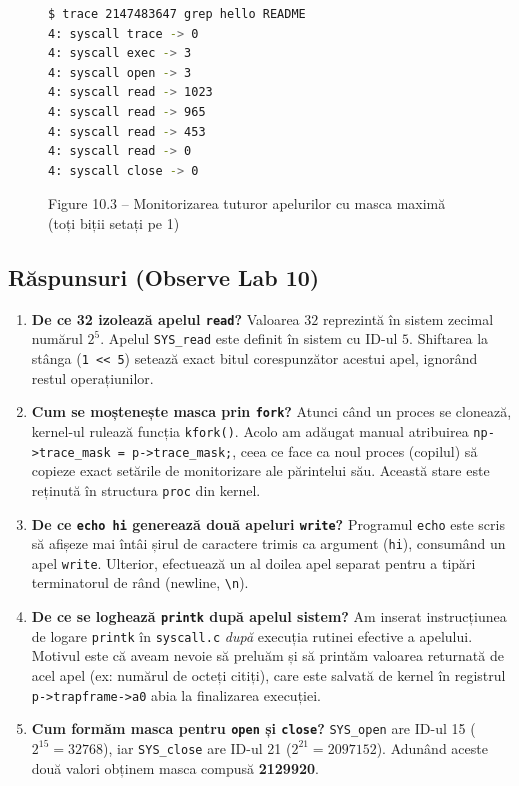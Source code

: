 \documentclass[12pt,a4paper]{article}
\begin{document}
\begin{figure}[h!]
\begin{lstlisting}[language=bash]
$ trace 2147483647 grep hello README
4: syscall trace -> 0
4: syscall exec -> 3
4: syscall open -> 3
4: syscall read -> 1023
4: syscall read -> 965
4: syscall read -> 453
4: syscall read -> 0
4: syscall close -> 0
\end{lstlisting}
\caption{Figure 10.3 -- Monitorizarea tuturor apelurilor cu masca maximă (toți biții setați pe 1)}
\end{figure}

\subsection{Răspunsuri (Observe Lab 10)}
\begin{enumerate}
    \item \textbf{De ce 32 izolează apelul \texttt{read}?} Valoarea $32$ reprezintă în sistem zecimal numărul $2^5$. Apelul \texttt{SYS\_read} este definit în sistem cu ID-ul $5$. Shiftarea la stânga (\texttt{1 << 5}) setează exact bitul corespunzător acestui apel, ignorând restul operațiunilor.
    \item \textbf{Cum se moștenește masca prin \texttt{fork}?} Atunci când un proces se clonează, kernel-ul rulează funcția \texttt{kfork()}. Acolo am adăugat manual atribuirea \texttt{np->trace\_mask = p->trace\_mask;}, ceea ce face ca noul proces (copilul) să copieze exact setările de monitorizare ale părintelui său. Această stare este reținută în structura \texttt{proc} din kernel.
    \item \textbf{De ce \texttt{echo hi} generează două apeluri \texttt{write}?} Programul \texttt{echo} este scris să afișeze mai întâi șirul de caractere trimis ca argument (\texttt{hi}), consumând un apel \texttt{write}. Ulterior, efectuează un al doilea apel separat pentru a tipări terminatorul de rând (newline, \texttt{\textbackslash n}).
    \item \textbf{De ce se loghează \texttt{printk} după apelul sistem?} Am inserat instrucțiunea de logare \texttt{printk} în \texttt{syscall.c} \textit{după} execuția rutinei efective a apelului. Motivul este că aveam nevoie să preluăm și să printăm valoarea returnată de acel apel (ex: numărul de octeți citiți), care este salvată de kernel în registrul \texttt{p->trapframe->a0} abia la finalizarea execuției.
    \item \textbf{Cum formăm masca pentru \texttt{open} și \texttt{close}?} \texttt{SYS\_open} are ID-ul 15 ($2^{15} = 32768$), iar \texttt{SYS\_close} are ID-ul 21 ($2^{21} = 2097152$). Adunând aceste două valori obținem masca compusă \textbf{2129920}.
\end{enumerate}
\end{document}
